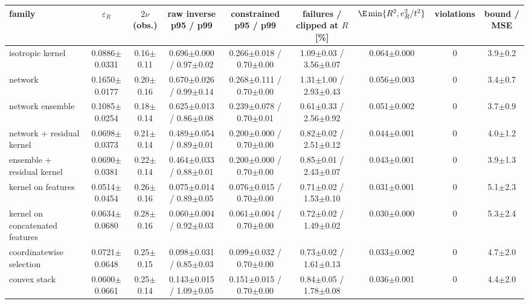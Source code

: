 \begin{tabular}{lcccccccc}
\toprule
family & $\varepsilon_R$ & $2\nu$ (obs.) & raw inverse p95 / p99 & constrained p95 / p99 & failures / clipped at $R$ [\%] & $\E\min\{R^2,e_R^2/t^2\}$ & violations & bound / MSE \\
\midrule
isotropic kernel & 0.0886$\pm$0.0331 & 0.16$\pm$0.11 & 0.696$\pm$0.000 / 0.97$\pm$0.02 & 0.266$\pm$0.018 / 0.70$\pm$0.00 & 1.09$\pm$0.03 / 3.56$\pm$0.07 & 0.064$\pm$0.000 & 0 & 3.9$\pm$0.2 \\
network & 0.1650$\pm$0.0177 & 0.20$\pm$0.16 & 0.670$\pm$0.026 / 0.99$\pm$0.14 & 0.268$\pm$0.111 / 0.70$\pm$0.00 & 1.31$\pm$1.00 / 2.93$\pm$0.43 & 0.056$\pm$0.003 & 0 & 3.4$\pm$0.7 \\
network ensemble & 0.1085$\pm$0.0254 & 0.18$\pm$0.14 & 0.625$\pm$0.013 / 0.86$\pm$0.08 & 0.239$\pm$0.078 / 0.70$\pm$0.01 & 0.61$\pm$0.33 / 2.56$\pm$0.92 & 0.051$\pm$0.002 & 0 & 3.7$\pm$0.9 \\
network + residual kernel & 0.0698$\pm$0.0373 & 0.21$\pm$0.14 & 0.489$\pm$0.054 / 0.89$\pm$0.01 & 0.200$\pm$0.000 / 0.70$\pm$0.00 & 0.82$\pm$0.02 / 2.51$\pm$0.12 & 0.044$\pm$0.001 & 0 & 4.0$\pm$1.2 \\
ensemble + residual kernel & 0.0690$\pm$0.0381 & 0.22$\pm$0.14 & 0.464$\pm$0.033 / 0.88$\pm$0.01 & 0.200$\pm$0.000 / 0.70$\pm$0.00 & 0.85$\pm$0.01 / 2.43$\pm$0.07 & 0.043$\pm$0.001 & 0 & 3.9$\pm$1.3 \\
kernel on features & 0.0514$\pm$0.0454 & 0.26$\pm$0.16 & 0.075$\pm$0.014 / 0.89$\pm$0.05 & 0.076$\pm$0.015 / 0.70$\pm$0.00 & 0.71$\pm$0.02 / 1.53$\pm$0.10 & 0.031$\pm$0.001 & 0 & 5.1$\pm$2.3 \\
kernel on concatenated features & 0.0634$\pm$0.0680 & 0.28$\pm$0.16 & 0.060$\pm$0.004 / 0.92$\pm$0.03 & 0.061$\pm$0.004 / 0.70$\pm$0.00 & 0.72$\pm$0.02 / 1.49$\pm$0.02 & 0.030$\pm$0.000 & 0 & 5.3$\pm$2.4 \\
coordinatewise selection & 0.0721$\pm$0.0648 & 0.25$\pm$0.15 & 0.098$\pm$0.031 / 0.85$\pm$0.03 & 0.099$\pm$0.032 / 0.70$\pm$0.00 & 0.73$\pm$0.02 / 1.61$\pm$0.13 & 0.033$\pm$0.002 & 0 & 4.7$\pm$2.0 \\
convex stack & 0.0600$\pm$0.0661 & 0.25$\pm$0.14 & 0.143$\pm$0.015 / 1.09$\pm$0.05 & 0.151$\pm$0.015 / 0.70$\pm$0.00 & 0.84$\pm$0.05 / 1.78$\pm$0.08 & 0.036$\pm$0.001 & 0 & 4.4$\pm$2.0 \\
\bottomrule
\end{tabular}
